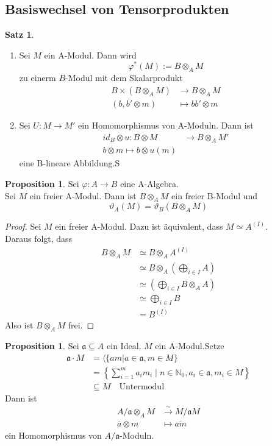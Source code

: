 \documentclass[10pt,a4paper]{article}
\newcommand{\N}{\ensuremath{\mathbb{N}}}
\newcommand{\ol}[1]{\overline{#1}}
\newcounter{thm}[section]
\theoremstyle{definition}
\newtheorem{satz}[thm]{Satz}
\newtheorem{prop}[thm]{Proposition}
\theoremstyle{plain}
\theoremstyle{remark}
\begin{document}
\subsection{Basiswechsel von Tensorprodukten}
\begin{satz}
	\begin{enumerate}
		\item Sei $M$ ein A-Modul. Dann wird
		\[\varphi^*(M):=B\otimes_A M\]
		zu einerm $B$-Modul mit dem Skalarprodukt
		\begin{align*}
		B\times(B\otimes_A M)&\rightarrow B\otimes_A M\\
		(b,b'\otimes m)&\mapsto bb'\otimes m
		\end{align*}
		\item Sei $U:M\rightarrow M'$ ein Homomorphismus von A-Moduln. Dann ist
		\begin{align*}
		id_B\otimes u:B\otimes M&\rightarrow  B\otimes_A M'\\
		b\otimes m\mapsto b\otimes u(m)
		\end{align*}
		eine B-lineare Abbildung.S
	\end{enumerate}
\end{satz}
\begin{prop}
	Sei $\varphi:A\rightarrow B$ eine A-Algebra.\\
	Sei $M$ ein freier A-Modul. Dann ist $B\otimes_A M$ ein freier B-Modul und
	\[\vartheta_A(M)=\vartheta_B(B\otimes_A M)\]
\end{prop}
\begin{proof}
	Sei $M$ ein freier A-Modul. Dazu ist äquivalent, dass $M\simeq A^{(I)}$.\\
	Daraus folgt, dass
	\begin{align*}
	B\otimes_A M&\simeq B\otimes_A A^{(I)}\\
	&\simeq B\otimes_A\left(\bigoplus_{i\in I}A\right)\\
	&\simeq \left(\bigoplus_{i\in I}B\otimes_A A\right)\\
	&\simeq\bigoplus_{i\in I}B\\
	&=B^{(I)}
	\end{align*}
	Also ist $B\otimes_A M$ frei.
\end{proof}
\begin{prop}
	Sei $\mathfrak{a}\subseteq A$ ein Ideal, $M$ ein A-Modul.Setze 
	\begin{align*}
	\mathfrak a\cdot M&=\langle \{am|a\in\mathfrak a,m\in M\}\\
	&=\left\{\sum_{i=1}^{m}a_im_i\mid n\in\N_0,a_i\in\mathfrak a,m_i\in M \right\}\\
	&\subseteq M \quad \text{Untermodul}
	\end{align*}
	Dann ist
	\begin{align*}
	A/\mathfrak a\otimes_A M&\xrightarrow{\sim} M/\mathfrak a M\\
	\ol a\otimes m&\mapsto \ol{am}
	\end{align*}
	ein Homomorphismus von $A/\mathfrak a$-Moduln.
\end{prop}
\end{document}
